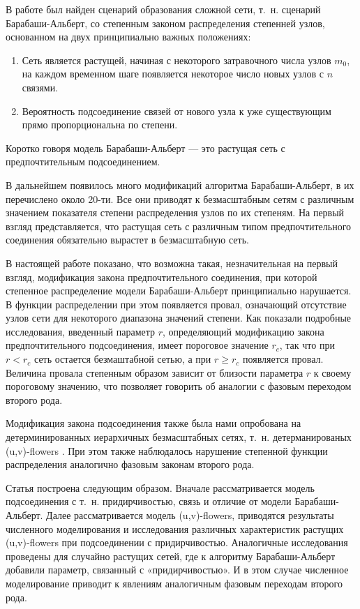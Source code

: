 \documentclass[10pt,aps,pra]{revtex4-1}
\begin{document}
В работе \cite{AlBa1} был найден сценарий образования сложной сети, т. н. сценарий Барабаши-Альберт, со степенным законом распределения степенней узлов, основанном на двух принципиально важных положениях:
\begin{enumerate} 
\item Сеть является растущей, начиная с некоторого затравочного числа узлов $m_0$, на каждом временном шаге появляется некоторое число новых узлов с $n$ связями.
\item Вероятность подсоединение связей от нового узла к уже существующим прямо пропорциональна по степени.
\end{enumerate}
Коротко говоря модель Барабаши-Альберт — это растущая сеть с предпочтительным подсоединением.

В дальнейшем появилось много модификаций алгоритма Барабаши-Альберт, в \cite{AlBa2} их перечислено около 20-ти. Все они приводят к безмасштабным сетям с различным значением показателя степени распределения узлов по их степеням. На первый взгляд представляется, что растущая сеть с различным типом предпочтительного соединения обязательно вырастет в безмасштабную сеть.

В настоящей работе показано, что возможна такая, незначительная на первый взгляд, модификация закона предпочтительного соединения, при которой степенное распределение модели Барабаши-Альберт принципиально нарушается. В функции распределении при этом появляется провал, означающий отсутствие узлов сети для некоторого диапазона значений степени. Как показали подробные исследования, введенный параметр $r$, определяющий модификацию закона предпочтительного подсоединения, имеет пороговое значение $r_c$, так что при $r<r_c$ сеть остается безмаштабной сетью, а при $r \geq r_c$ появляется провал. Величина провала степенным образом зависит от близости параметра $r$ к своему пороговому значению, что позволяет говорить об аналогии с фазовым переходом второго рода.

Модификация закона подсоединения также была нами опробована на детерминированных иерархичных безмасштабных сетях, т. н. детерманированых (u,v)-flowers \cite{Dor1}. При этом также наблюдалось нарушение степенной функции распределения аналогично фазовым законам второго рода.

Статья построена следующим образом. Вначале рассматривается модель подсоединения с т. н. придирчивостью, связь и отличие от модели Барабаши-Альберт. Далее рассматривается модель (u,v)-flowers, приводятся результаты численного моделирования и исследования различных характеристик растущих (u,v)-flowers при подсоединении с придирчивостью. Аналогичные исследования проведены для случайно растущих сетей, где к алгоритму Барабаши-Альберт добавили параметр, связанный с «придирчивостью». И в этом случае численное моделирование приводит к явлениям аналогичным фазовым переходам второго рода.
\end{document}
